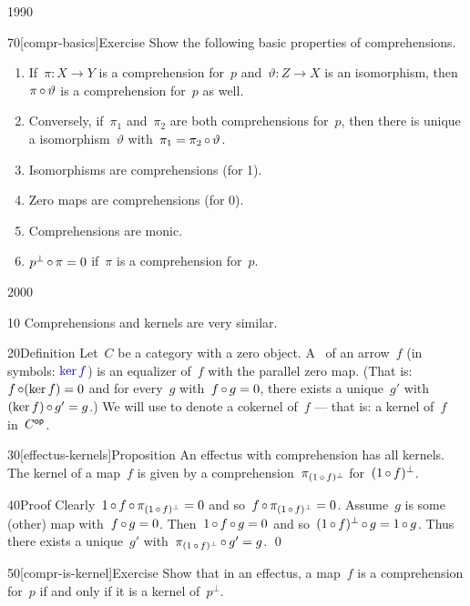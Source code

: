 \begin{parsec}{1990}
\begin{point}{70}[compr-basics]{Exercise}
Show the following basic properties of comprehensions.
\begin{enumerate}
    \item If~$\pi\colon X \to Y$ is a comprehension for~$p$
                and~$\vartheta\colon Z \to X$ is an isomorphism,
                then~$\pi \mathop{\circ} \vartheta$ is a comprehension for~$p$
                as well.
    \item Conversely, if~$\pi_1$ and~$\pi_2$
            are both comprehensions for~$p$,
            then there is unique a isomorphism~$\vartheta$
            with~$\pi_1 = \pi_2 \mathop{\circ} \vartheta$.
    \item Isomorphisms are comprehensions (for 1).
    \item Zero maps are comprehensions (for 0).
    \item Comprehensions are monic.
    \item $p^\perp \mathop{\circ} \pi = 0$ if~$\pi$ is a comprehension for~$p$.
\end{enumerate}
\end{point}
\end{parsec}

\begin{parsec}{2000}%
\begin{point}{10}%
Comprehensions and kernels are very similar.
\end{point}
\begin{point}{20}{Definition}%
Let~$C$ be a category with a zero object.
A ~of an arrow~$f$
    (in symbols: $\Define{\ker f}$)
    is an equalizer of~$f$ with the parallel zero map.
(That is: $f \mathop{\circ} (\ker f) = 0$
    and for every~$g$ with~$f \mathop{\circ} g = 0$,
    there exists a unique~$g'$ with~$(\ker f) \mathop{\circ} g' = g$.)
We will use 
    to denote a cokernel of~$f$
    --- that is: a kernel of~$f$ in~${C}{^{\mathsf{op}}}$.
\end{point}
\begin{point}{30}[effectus-kernels]{Proposition}%
An effectus with comprehension has all kernels.
    The kernel of a map~$f$ is given by
        a comprehension~$\pi_{(1 \mathop{\circ} f)^\perp}$
        for~$(1 \mathop{\circ} f)^\perp$.
\begin{point}{40}{Proof}%
Clearly~$1 \mathop{\circ} f \mathop{\circ} \pi_{(1 \mathop{\circ} f)^\perp} = 0$
    and so~$f \mathop{\circ} \pi_{(1 \mathop{\circ} f)^\perp} = 0$.
Assume~$g$ is some (other) map with~$f \mathop{\circ} g = 0$.
Then~$1 \mathop{\circ} f \mathop{\circ} g = 0$
    and so~$(1 \mathop{\circ} f)^\perp \mathop{\circ} g = 1 \mathop{\circ} g$.
Thus there exists a unique~$g'$
    with~$\pi_{(1 \mathop{\circ} f)^\perp} \mathop{\circ} g' = g$. \qed
\end{point}
\end{point}
\begin{point}{50}[compr-is-kernel]{Exercise}%
Show that in an effectus,
    a map~$f$ is a comprehension for~$p$
    if and only if it is a kernel of~$p^\perp$.
\end{point}
\end{parsec}

